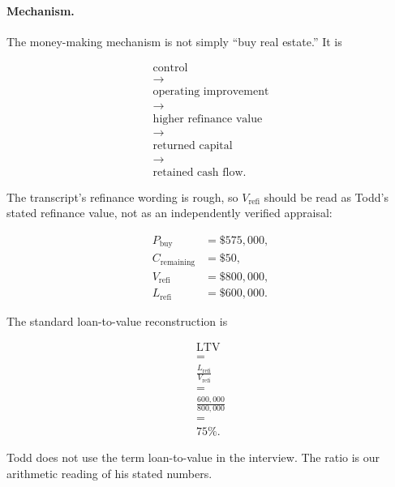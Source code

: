 \documentclass[11pt,oneside]{book}
\begin{document}
\paragraph{Mechanism.}
The money-making mechanism is not simply ``buy real estate.'' It is

\begin{equation}
\begin{gathered}
\text{control}\\
\rightarrow\\
\text{operating improvement}\\
\rightarrow\\
\text{higher refinance value}\\
\rightarrow\\
\text{returned capital}\\
\rightarrow\\
\text{retained cash flow}.
\end{gathered}
\end{equation}

The transcript's refinance wording is rough, so \(V_{\mathrm{refi}}\) should be read as Todd's stated refinance value, not as an independently verified appraisal:

\begin{align}
P_{\mathrm{buy}} &= \$575{,}000,\\
C_{\mathrm{remaining}} &= \$50,\\
V_{\mathrm{refi}} &= \$800{,}000,\\
L_{\mathrm{refi}} &= \$600{,}000.
\end{align}

The standard loan-to-value reconstruction is

\begin{equation}
\begin{gathered}
\mathrm{LTV}\\
=\\
\frac{L_{\mathrm{refi}}}{V_{\mathrm{refi}}}\\
=\\
\frac{600{,}000}{800{,}000}\\
=\\
75\%.
\end{gathered}
\end{equation}

Todd does not use the term loan-to-value in the interview. The ratio is our arithmetic reading of his stated numbers.
\end{document}
